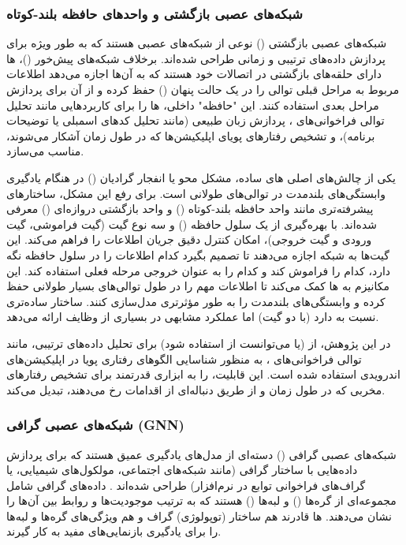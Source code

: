 \subsubsection{شبکه‌های عصبی بازگشتی و واحدهای حافظه بلند-کوتاه }
شبکه‌های عصبی بازگشتی () نوعی از شبکه‌های عصبی هستند که به طور ویژه برای پردازش داده‌های ترتیبی و زمانی طراحی شده‌اند. برخلاف شبکه‌های پیش‌خور ()، ها دارای حلقه‌های بازگشتی در اتصالات خود هستند که به آن‌ها اجازه می‌دهد اطلاعات مربوط به مراحل قبلی توالی را در یک حالت پنهان () حفظ کرده و از آن برای پردازش مراحل بعدی استفاده کنند. این "حافظه" داخلی، ها را برای کاربردهایی مانند تحلیل توالی فراخوانی‌های ، پردازش زبان طبیعی (مانند تحلیل کدهای اسمبلی یا توضیحات برنامه)، و تشخیص رفتارهای پویای اپلیکیشن‌ها که در طول زمان آشکار می‌شوند، مناسب می‌سازد.

یکی از چالش‌های اصلی های ساده، مشکل محو یا انفجار گرادیان () در هنگام یادگیری وابستگی‌های بلندمدت در توالی‌های طولانی است. برای رفع این مشکل، ساختارهای پیشرفته‌تری مانند واحد حافظه بلند-کوتاه () \cite{Hochreiter1997} و واحد بازگشتی دروازه‌ای () \cite{Cho2014} معرفی شده‌اند.  با بهره‌گیری از یک سلول حافظه () و سه نوع گیت (گیت فراموشی، گیت ورودی و گیت خروجی)، امکان کنترل دقیق جریان اطلاعات را فراهم می‌کند. این گیت‌ها به شبکه اجازه می‌دهند تا تصمیم بگیرد کدام اطلاعات را در سلول حافظه نگه دارد، کدام را فراموش کند و کدام را به عنوان خروجی مرحله فعلی استفاده کند. این مکانیزم به ها کمک می‌کند تا اطلاعات مهم را در طول توالی‌های بسیار طولانی حفظ کرده و وابستگی‌های بلندمدت را به طور مؤثرتری مدل‌سازی کنند.  ساختار ساده‌تری نسبت به  دارد (با دو گیت) اما عملکرد مشابهی در بسیاری از وظایف ارائه می‌دهد.

در این پژوهش، از  (یا می‌توانست از  استفاده شود) برای تحلیل داده‌های ترتیبی، مانند توالی فراخوانی‌های ، به منظور شناسایی الگوهای رفتاری پویا در اپلیکیشن‌های اندرویدی استفاده شده است. این قابلیت،  را به ابزاری قدرتمند برای تشخیص رفتارهای مخربی که در طول زمان و از طریق دنباله‌ای از اقدامات رخ می‌دهند، تبدیل می‌کند.

\subsubsection{شبکه‌های عصبی گرافی (GNN)}
شبکه‌های عصبی گرافی () دسته‌ای از مدل‌های یادگیری عمیق هستند که برای پردازش داده‌هایی با ساختار گرافی (مانند شبکه‌های اجتماعی، مولکول‌های شیمیایی، یا گراف‌های فراخوانی توابع در نرم‌افزار) طراحی شده‌اند \cite{sanchez-lengeling2021a}. داده‌های گرافی شامل مجموعه‌ای از گره‌ها () و لبه‌ها () هستند که به ترتیب موجودیت‌ها و روابط بین آن‌ها را نشان می‌دهند. ها قادرند هم ساختار (توپولوژی) گراف و هم ویژگی‌های گره‌ها و لبه‌ها را برای یادگیری بازنمایی‌های مفید به کار گیرند.

